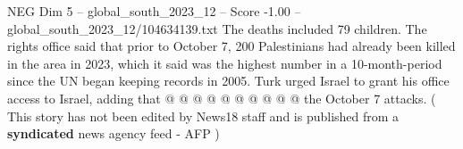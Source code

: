 \begin{textsample}{NEG Dim 5 – global\_south\_2023\_12 – Score -1.00 – global\_south\_2023\_12/104634139.txt}
The deaths included 79 children.
The rights office said that prior to October 7, 200 Palestinians had already been killed in the area in 2023, which it said was the highest number in a 10-month-period since the UN began keeping records in 2005.
Turk urged Israel to grant his office access to Israel, adding that @ @ @ @ @ @ @ @ @ @ the October 7 attacks. ( This story has not been edited by News18 staff and is published from a \textbf{syndicated} news agency feed - AFP )

\end{textsample}
